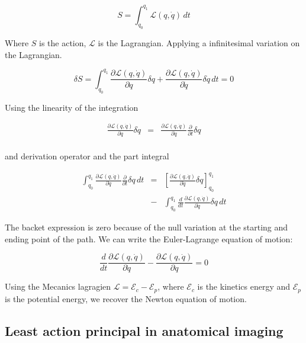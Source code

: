 \documentclass[final, paper=letter,5p,times,twocolumn]{elsarticle}
\theoremstyle{definition}
\begin{document}
{$$
S = \int_{q_{0}}^{q_{1}} \mathcal{L}(q, \dot{q}) \, dt
$$

Where $S$ is the action, $\mathcal{L}$ is the Lagrangian. Applying a infinitesimal variation on the Lagrangian.

$$
\delta S =  \int_{q_{0}}^{q_{1}} \frac{\partial\mathcal{L}(q, \dot{q})}{\partial q} \delta q + \frac{\partial\mathcal{L}(q, \dot{q})}{\partial \dot{q}} \delta \dot{q} \, dt = 0
$$

Using the linearity of the integration

\begin{eqnarray*}
    \frac{\partial\mathcal{L}(q, \dot{q})}{\partial \dot{q}} \delta \dot{q} & = & \frac{\partial\mathcal{L}(q, \dot{q})}{\partial \dot{q}} \frac{\partial }{\partial t} \delta q \\
\end{eqnarray*}


and derivation operator and the part integral

\begin{eqnarray*}
    \int_{q_{0}}^{q_{1}} \frac{\partial\mathcal{L}(q, \dot{q})}{\partial \dot{q}} \frac{\partial }{\partial t} \delta q  \, dt & = & \left \lbrack \frac{\partial\mathcal{L}(q, \dot{q})}{\partial \dot{q}} \delta q \right \rbrack_{q_{0}}^{q_{1}} \\
    & - &  \int_{q_{0}}^{q_{1}} \frac{d}{dt} \frac{\partial\mathcal{L}(q, \dot{q})}{\partial \dot{q}} \delta q \, dt
\end{eqnarray*}

The backet expression is zero because of the null variation at the starting and ending point of the path. We can write the Euler-Lagrange equation of motion:

$$
\frac{d}{dt} \frac{\partial\mathcal{L}(q, \dot{q})}{\partial \dot{q}} - \frac{\partial\mathcal{L}(q, \dot{q})}{\partial q} = 0 
\label{Euler_Lagrange}
$$

Using the Mecanics lagragien $\mathcal{L} = \mathcal{E}_{c} - \mathcal{E}_{p}$, where $\mathcal{E}_{c}$ is the kinetics energy and $\mathcal{E}_{p}$ is the potential energy, we recover the Newton equation of motion.  


\subsection{Least action principal in anatomical imaging}




}
\end{document}
